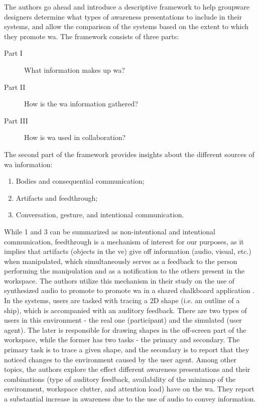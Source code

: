 The authors go ahead and introduce a descriptive framework to help groupware
designers determine what types of awareness presentations to include in their systems, and allow the comparison of the systems based on the extent to which they promote \gls{wa}.
The framework consists of three parts:
\begin{description}
	\item[Part I] What information makes up \gls{wa}?
	\item[Part II] How is the \gls{wa} information gathered?
	\item[Part III] How is \gls{wa} used in collaboration?
\end{description}

The second part of the framework provides insights about the different sources of \gls{wa} information: 
\begin{enumerate}
	\item Bodies and consequential communication;
	\item Artifacts and feedthrough;
	\item Conversation, gesture, and intentional communication.
\end{enumerate}
While 1 and 3 can be summarized as non-intentional and intentional communication, feedthrough is a mechanism of interest for our purposes, as it implies that artifacts (objects in the \gls{ve}) give off information (audio, visual, etc.) when manipulated, which simultaneously serves as a feedback to the person performing the manipulation and as a notification to the others present in the workspace.
The authors utilize this mechanism in their study on the use of synthesized audio to promote to promote \gls{wa} in a shared chalkboard application \cite{gutwin_chalk_2011}. In the systems, users are tasked with tracing a 2D shape (i.e. an outline of a ship), which is accompanied with an auditory feedback. There are two types of users in this environment - the real one (participant) and the simulated (user agent). The later is responsible for drawing shapes in the off-screen part of the workspace, while the former has two tasks - the primary and secondary. The primary task is to trace a given shape, and the secondary is to report that they noticed changes to the environment caused by the user agent. Among other topics, the authors explore the effect different awareness presentations and their combinations (type of auditory feedback, availability of the minimap of the environment, workspace clutter, and attention load) have on the \gls{wa}. They report a substantial increase in awareness due to the use of audio to convey information.

